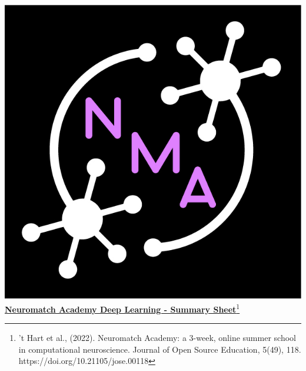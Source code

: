 \documentclass[10pt,a4paper]{article}
\begin{document}
\begin{multicols}{3}

\end{multicols}
\newpage
\includegraphics[scale=0.1]{Figures/nma-logo-square-4xp.jpeg}\href{https://compneuro.neuromatch.io/tutorials/intro.html}{\textbf{\Huge{Neuromatch Academy Deep Learning - Summary Sheet}}\footnote{’t Hart et al., (2022). Neuromatch Academy: a 3-week, online summer school in computational neuroscience. Journal of Open Source Education, 5(49), 118. https://doi.org/10.21105/jose.00118}}
\begin{multicols}{3}

\end{multicols}
\end{document}
